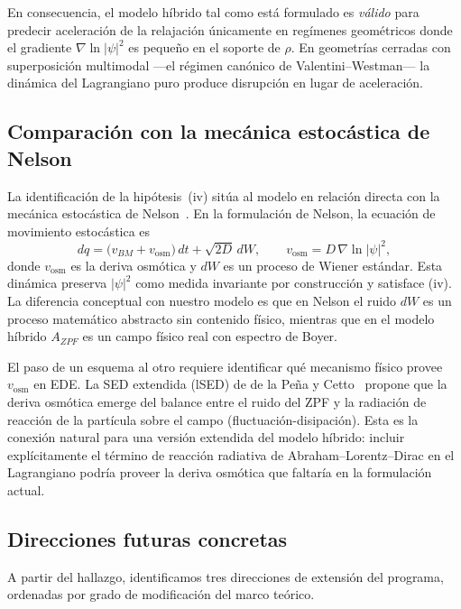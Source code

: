 \documentclass[11pt,a4paper]{article}
\begin{document}
En consecuencia, el modelo híbrido tal como está formulado es
\emph{válido} para predecir aceleración de la relajación únicamente en
regímenes geométricos donde el gradiente $\nabla\ln|\psi|^2$ es pequeño
en el soporte de $\rho$. En geometrías cerradas con superposición
multimodal ---el régimen canónico de Valentini--Westman--- la dinámica
del Lagrangiano puro produce disrupción en lugar de aceleración.

\subsection{Comparación con la mecánica estocástica de Nelson}
\label{sec:comparacion_nelson}

La identificación de la hipótesis~(iv) sitúa al modelo en relación
directa con la mecánica estocástica de Nelson~\cite{Nelson1966}. En la
formulación de Nelson, la ecuación de movimiento estocástica es
\begin{equation}
dq = \big(v_{BM}+v_\text{osm}\big)\,dt + \sqrt{2D}\,dW,
\qquad
v_\text{osm} = D\,\nabla\ln|\psi|^2,
\label{eq:nelson_sde}
\end{equation}
donde $v_\text{osm}$ es la deriva osmótica y $dW$ es un proceso de
Wiener estándar. Esta dinámica preserva $|\psi|^2$ como medida
invariante por construcción y satisface (iv). La diferencia conceptual
con nuestro modelo es que en Nelson el ruido $dW$ es un proceso
matemático abstracto sin contenido físico, mientras que en el modelo
híbrido $A_{ZPF}$ es un campo físico real con espectro de Boyer.

El paso de un esquema al otro requiere identificar qué mecanismo
físico provee $v_\text{osm}$ en EDE. La SED extendida (lSED) de de la
Peña y Cetto~\cite{delaPenaCetto1996} propone que la deriva osmótica
emerge del balance entre el ruido del ZPF y la radiación de reacción
de la partícula sobre el campo (fluctuación-disipación). Esta es la
conexión natural para una versión extendida del modelo híbrido:
incluir explícitamente el término de reacción radiativa de
Abraham--Lorentz--Dirac en el Lagrangiano podría proveer la deriva
osmótica que faltaría en la formulación actual.

\subsection{Direcciones futuras concretas}
\label{sec:direcciones_futuras}

A partir del hallazgo, identificamos tres direcciones de extensión del
programa, ordenadas por grado de modificación del marco teórico.
\end{document}
